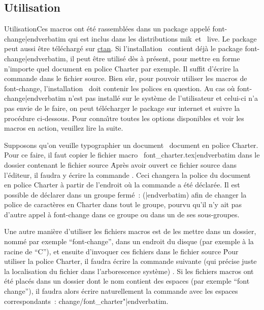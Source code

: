 {\subsection{Utilisation}{Utilisation}Ces macros ont \'et\'e rassembl\'ees dans un package appel\'e {\color{brown}\verbatim font-change|endverbatim} qui est inclus dans les distributions {\caps m{\eightrm i}k}\capstex\ et \capstex~{\caps l{\eightrm ive}}. Le package peut aussi \^etre t\'el\'echarg\'e sur \href{http://www.ctan.org/tex-archive/macros/plain/contrib/font-change/}{\caps ctan}. Si l'installation \capstex\ contient d\'ej\`a le package {\color{brown}\verbatim font-change|endverbatim}, il peut \^etre utilis\'e d\`es \`a pr\'esent, pour mettre en forme n'importe quel document en police Charter par exemple. Il suffit d'\'ecrire la commande {\color{brown}\verbatim } dans le fichier source. Bien s\^ur, pour pouvoir utiliser les macros de font-change, l'installation \capstex\ doit contenir les polices en question. Au cas o\`u {\color{brown}\verbatim font-change|endverbatim} n'est pas install\'e sur le syst\`eme de l'utilisateur et celui-ci n'a pas envie de le faire, on peut t\'el\'echarger le package sur internet et suivre la proc\'edure ci-dessous. Pour conna\^\i tre toutes les options disponibles et voir les macros en action, veuillez lire la suite.

Supposons qu'on veuille typographier un document \capstex\ document en police Charter. Pour ce faire, il faut copier le fichier macro \capstex\ {\color{brown}\verbatim font_charter.tex|endverbatim} dans le dossier contenant le fichier source \capstex\. Apr\`es avoir ouvert ce fichier source dans l'\'editeur, il faudra y \'ecrire la commande {\color{brown}\verbatim }. Ceci changera la police du document en police Charter \`a partir de l'endroit o\`u la commande {\color{brown}\verbatim } a \'et\'e d\'eclar\'ee. Il est possible de d\'eclarer {\color{brown}\verbatim } dans un groupe ferm\'e~: ({\color{brown}|endverbatim}) afin de changer la police de caract\`eres en Charter dans tout le groupe, pourvu qu'il n'y ait pas d'autre appel \`a font-change dans ce groupe ou dans un de ses sous-groupes.

Une autre mani\`ere d'utiliser les fichiers macros est de les mettre dans un dossier, nomm\'e par exemple ``font-change'', dans un endroit du disque (par exemple \`a la racine de ``C''), et ensuite d'invoquer ces fichiers dans le fichier source \capstex\. Pour utiliser la police Charter, il faudra \'ecrire la commande suivante (qui pr\'ecise juste la localisation du fichier dans l'arborescence syst\`eme) {\color{brown}\verbatim }. Si les fichiers macros ont \'et\'e plac\'es dans un dossier dont le nom contient des espaces (par exemple ``font change''), il faudra alors \'ecrire naturellement la commande avec les espaces correspondants~: {\color{brown}\verbatim  change/font_charter"|endverbatim}.

}
